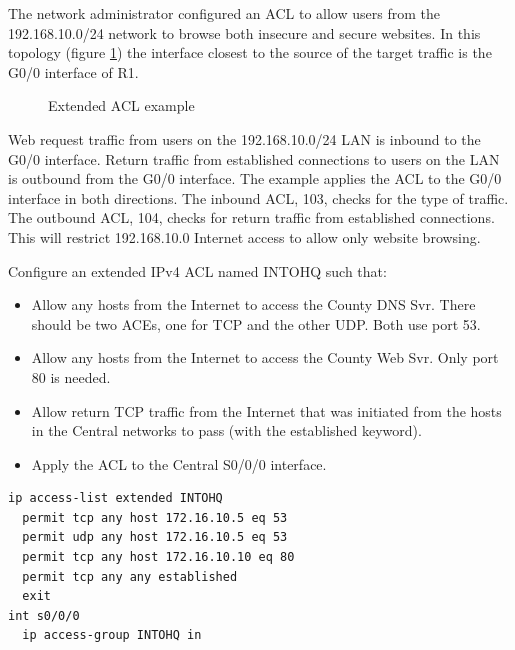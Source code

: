\begin{example}
The network administrator configured an ACL to allow users from the 192.168.10.0/24 network to browse both insecure and secure websites. In this topology (figure \ref{example4}) the interface closest to the source of the target traffic is the G0/0 interface of R1.
\begin{figure}[hbtp]
\caption{Extended ACL example}\label{example4}
\centering
{}
\end{figure}
Web request traffic from users on the 192.168.10.0/24 LAN is inbound to the G0/0 interface. Return traffic from established connections to users on the LAN is outbound from the G0/0 interface. The example applies the ACL to the G0/0 interface in both directions. The inbound ACL, 103, checks for the type of traffic. The outbound ACL, 104, checks for return traffic from established connections. This will restrict 192.168.10.0 Internet access to allow only website browsing.
\end{example}

\begin{example}
Configure an extended IPv4 ACL named INTOHQ such that: 
\begin{itemize}
\item Allow any hosts from the Internet to access the County DNS Svr. There should be two ACEs, one for TCP and the other UDP. Both use port 53.
\item Allow any hosts from the Internet to access the County Web Svr. Only port 80 is needed.
\item Allow return TCP traffic from the Internet that was initiated from the hosts in the Central networks to pass (with the established keyword).
\item Apply the ACL to the Central S0/0/0 interface.
\end{itemize}
\begin{verbatim}
ip access-list extended INTOHQ
  permit tcp any host 172.16.10.5 eq 53
  permit udp any host 172.16.10.5 eq 53
  permit tcp any host 172.16.10.10 eq 80
  permit tcp any any established
  exit
int s0/0/0
  ip access-group INTOHQ in
\end{verbatim}
\end{example}

